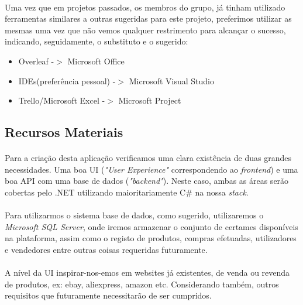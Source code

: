 \documentclass[a4paper,12pt]{scrreprt}
\begin{document}
            \paragraph{}
            Uma vez que em projetos passados, os membros do grupo, já tinham utilizado ferramentas similares a outras sugeridas para este projeto, preferimos utilizar as mesmas uma vez que não vemos qualquer restrimento para alcançar o sucesso, indicando, seguidamente, o substituto e o sugerido:
            \begin{itemize}
                \item Overleaf -$>$ Microsoft Office
                \item IDEs(preferência pessoal) -$>$ Microsoft Visual Studio
                \item Trello/Microsoft Excel -$>$ Microsoft Project
            \end{itemize}
        
        \subsection{Recursos Materiais}
            \paragraph{}
            Para a criação desta aplicação verificamos uma clara existência de duas grandes necessidades. Uma boa UI (\textit{"User Experience"} correspondendo ao \textit{frontend}) e uma boa API com uma base de dados (\textit{"backend"}). Neste caso, ambas as áreas serão cobertas pelo .NET utilizando maioritariamente C\# na nossa \textit{stack}.
            \paragraph{}
            Para utilizarmos o sistema base de dados, como sugerido, utilizaremos o \textit{Microsoft SQL Server}, onde iremos armazenar o conjunto de certames disponíveis na plataforma, assim como o registo de produtos, compras efetuadas, utilizadores e vendedores entre outras coisas requeridas futuramente.
            \paragraph{}
            A nível da UI inspirar-nos-emos em websites já existentes, de venda ou revenda de produtos, ex: ebay, aliexpress, amazon etc. Considerando também, outros requisitos que futuramente necessitarão de ser cumpridos.
\end{document}
